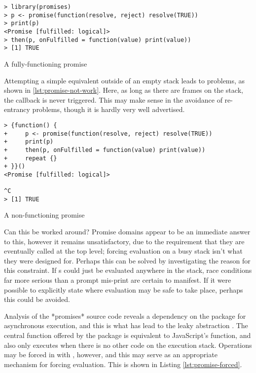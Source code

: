 \begin{listing}
\begin{verbatim}
> library(promises)
> p <- promise(function(resolve, reject) resolve(TRUE))
> print(p)
<Promise [fulfilled: logical]>
> then(p, onFulfilled = function(value) print(value))
> [1] TRUE
\end{verbatim}
\caption{A fully-functioning promise}
\label{lst:promise-work}
\end{listing}

Attempting a simple equivalent outside of an empty stack leads to problems, as shown in \cref{lst:promise-not-work}.
Here, as long as there are frames on the stack, the  callback is never triggered.
This may make sense in the avoidance of re-entrancy problems, though it is hardly very well advertised.

\begin{listing}
\begin{verbatim}
> {function() {
+     p <- promise(function(resolve, reject) resolve(TRUE))
+     print(p)
+     then(p, onFulfilled = function(value) print(value))
+     repeat {}
+ }}()
<Promise [fulfilled: logical]>

^C
> [1] TRUE
\end{verbatim}
\caption{A non-functioning promise}
\label{lst:promise-not-work}
\end{listing}

Can this be worked around?
Promise domains appear to be an immediate answer to this, however it remains unsatisfactory, due to the requirement that they are eventually called at the top level; forcing evaluation on a busy stack isn't what they were designed for.
Perhaps this can be solved by investigating the reason for this constraint.
If s could just be evaluated anywhere in the stack, race conditions far more serious than a prompt mis-print are certain to manifest.
If it were possible to explicitly state where evaluation may be safe to take place, perhaps this could be avoided.

Analysis of the *promises* source code reveals a dependency on the  package for asynchronous execution, and this is what has lead to the leaky abstraction \cite{chang2021later}.
The central  function offered by the package is equivalent to JavaScript's  function, and also only executes when there is no other \R code on the execution stack.
Operations may be forced in  with , however, and this may serve as an appropriate mechanism for forcing evaluation.
This is shown in Listing \cref{lst:promise-forced}.

